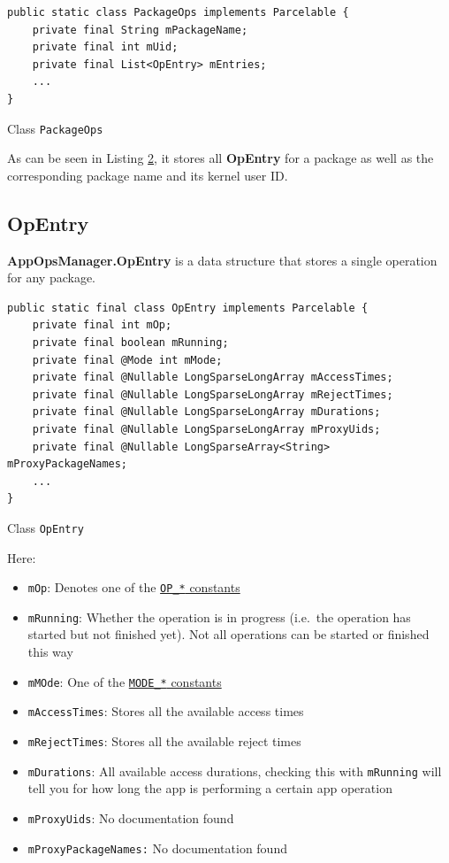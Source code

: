 \begin{listing}[H]
    \begin{verbatim}
public static class PackageOps implements Parcelable {
    private final String mPackageName;
    private final int mUid;
    private final List<OpEntry> mEntries;
    ...
}
    \end{verbatim}
    \caption{Class \texttt{PackageOps}}
    \label{lst:package-ops-class}
\end{listing}

As can be seen in Listing \hyperref[cb12]{2}, it stores all \textbf{OpEntry} for a package as well as the
corresponding package name and its kernel user ID\@.

\subsection{OpEntry}\label{subsec:opentry}
\textbf{AppOpsManager.OpEntry} is a data structure that stores a single operation for any package.

\begin{listing}[H]
    \begin{verbatim}
public static final class OpEntry implements Parcelable {
    private final int mOp;
    private final boolean mRunning;
    private final @Mode int mMode;
    private final @Nullable LongSparseLongArray mAccessTimes;
    private final @Nullable LongSparseLongArray mRejectTimes;
    private final @Nullable LongSparseLongArray mDurations;
    private final @Nullable LongSparseLongArray mProxyUids;
    private final @Nullable LongSparseArray<String> mProxyPackageNames;
    ...
}
    \end{verbatim}
    \caption{Class \texttt{OpEntry}}
    \label{lst:class-op-entry}
\end{listing}
Here:
\begin{itemize}
    \item \texttt{mOp}: Denotes one of the \hyperref[subsec:op-constants]{\texttt{OP\_*} constants}
    \item \texttt{mRunning}: Whether the operation is in progress (i.e.\ the operation has started but not finished
    yet). Not all operations can be started or finished this way
    \item \texttt{mMOde}: One of the \hyperref[subsec:mode-constants]{\texttt{MODE\_*} constants}
    \item \texttt{mAccessTimes}: Stores all the available access times
    \item \texttt{mRejectTimes}: Stores all the available reject times
    \item \texttt{mDurations}: All available access durations, checking this with \texttt{mRunning} will tell you for
    how long the app is performing a certain app operation
    \item \texttt{mProxyUids}: No documentation found
    \item \texttt{mProxyPackageNames:} No documentation found
\end{itemize}

